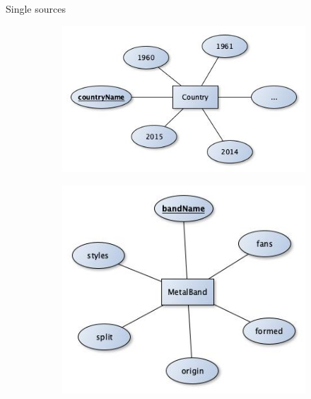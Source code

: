\documentclass{beamer}
\begin{document}
\begin{frame}{Single sources}
	\begin{figure}
		\begin{subfigure}[b]{0.315\textwidth}
			\includegraphics[width=\textwidth]{ER/g2-country.jpg}
		\end{subfigure}
		\begin{subfigure}[b]{0.315\textwidth}
			\includegraphics[width=\textwidth]{ER/g2-metal.jpg}
		\end{subfigure}
		\begin{subfigure}[b]{0.315\textwidth}

\end{subfigure}
\end{figure}
\end{frame}
\end{document}
